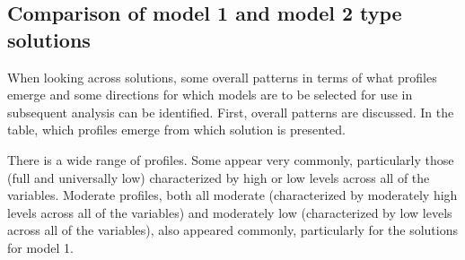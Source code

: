 \documentclass[]{msu-thesis}
\theoremstyle{definition}
\theoremstyle{definition}
\theoremstyle{definition}
\theoremstyle{remark}
\begin{document}
\subsection{Comparison of model 1 and model 2 type
solutions}\label{comparison-of-model-1-and-model-2-type-solutions}

When looking across solutions, some overall patterns in terms of what
profiles emerge and some directions for which models are to be selected
for use in subsequent analysis can be identified. First, overall
patterns are discussed. In the table, which profiles emerge from which
solution is presented.

There is a wide range of profiles. Some appear very commonly,
particularly those (full and universally low) characterized by high or
low levels across all of the variables. Moderate profiles, both all
moderate (characterized by moderately high levels across all of the
variables) and moderately low (characterized by low levels across all of
the variables), also appeared commonly, particularly for the solutions
for model 1.
\end{document}
